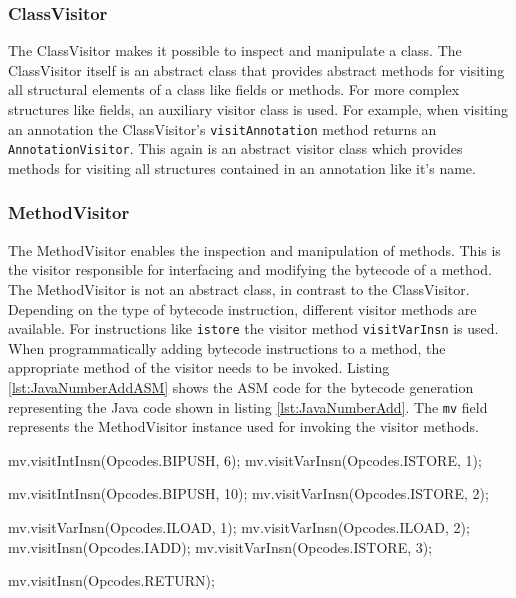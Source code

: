 \subsubsection{ClassVisitor}

The ClassVisitor makes it possible to inspect and manipulate a class. The ClassVisitor itself is an abstract class that provides abstract methods for visiting all structural elements of a class like fields or methods. For more complex structures like fields, an auxiliary visitor class is used. For example, when visiting an annotation the ClassVisitor's \texttt{visitAnnotation} method returns an \texttt{AnnotationVisitor}. This again is an abstract visitor class which provides methods for visiting all structures contained in an annotation like it's name. 

\subsubsection{MethodVisitor}

The MethodVisitor enables the inspection and manipulation of methods. This is the visitor responsible for interfacing and modifying the bytecode of a method. The MethodVisitor is not an abstract class, in contrast to the ClassVisitor. Depending on the type of bytecode instruction, different visitor methods are available. For instructions like \texttt{istore} the visitor method \texttt{visitVarInsn} is used. When programmatically adding bytecode instructions to a method, the appropriate method of the visitor needs to be invoked. Listing \ref{lst:JavaNumberAddASM} shows the ASM code for the bytecode generation representing the Java code shown in listing \ref{lst:JavaNumberAdd}. The \texttt{mv} field represents the MethodVisitor instance used for invoking the visitor methods.

\begin{JavaCode}[float,numbers=none,caption=ASM code for bytecode generation of the Java program shown in listing \ref{lst:JavaNumberAdd}., label=lst:JavaNumberAddASM]
mv.visitIntInsn(Opcodes.BIPUSH, 6);
mv.visitVarInsn(Opcodes.ISTORE, 1); 

mv.visitIntInsn(Opcodes.BIPUSH, 10);
mv.visitVarInsn(Opcodes.ISTORE, 2); 


mv.visitVarInsn(Opcodes.ILOAD, 1); 
mv.visitVarInsn(Opcodes.ILOAD, 2); 
mv.visitInsn(Opcodes.IADD);        
mv.visitVarInsn(Opcodes.ISTORE, 3);

mv.visitInsn(Opcodes.RETURN);
\end{JavaCode}